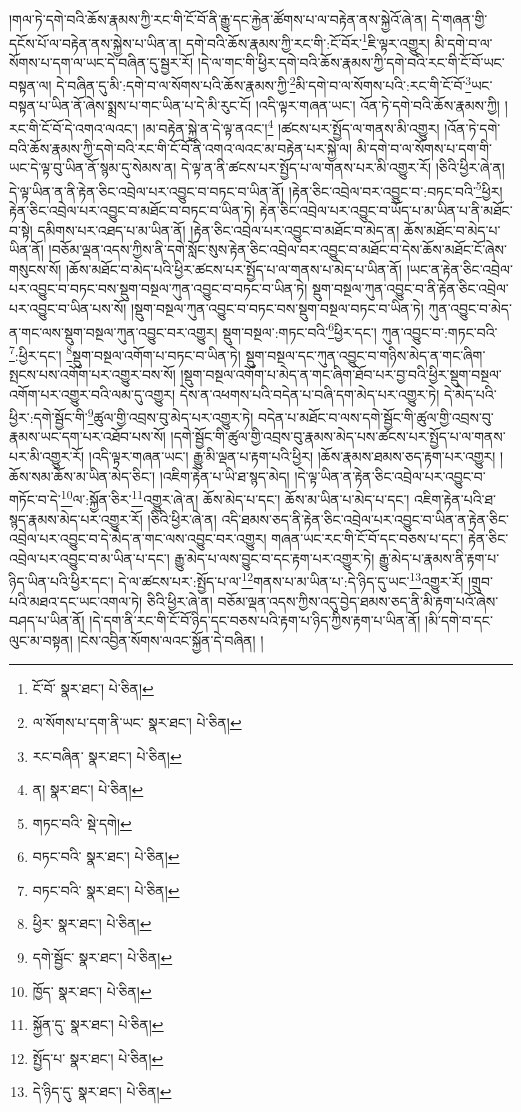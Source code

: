 །གལ་ཏེ་དགེ་བའི་ཆོས་རྣམས་ཀྱི་རང་གི་ངོ་བོ་ནི་རྒྱུ་དང་རྐྱེན་ཚོགས་པ་ལ་བརྟེན་ནས་སྐྱེའོ་ཞེ་ན། དེ་གཞན་གྱི་དངོས་པོ་ལ་བརྟེན་ནས་སྐྱེས་པ་ཡིན་ན། དགེ་བའི་ཆོས་རྣམས་ཀྱི་རང་གི་:ངོ་བོར་\footnote{ངོ་བོ་  སྣར་ཐང་།  པེ་ཅིན། }ཇི་ལྟར་འགྱུར། མི་དགེ་བ་ལ་སོགས་པ་དག་ལ་ཡང་དེ་བཞིན་དུ་སྦྱར་རོ། །དེ་ལ་གང་གི་ཕྱིར་དགེ་བའི་ཆོས་རྣམས་ཀྱི་དགེ་བའི་རང་གི་ངོ་བོ་ཡང་བསྟན་ལ། དེ་བཞིན་དུ་མི་:དགེ་བ་ལ་སོགས་པའི་ཆོས་རྣམས་ཀྱི་\footnote{ལ་སོགས་པ་དག་ནི་ཡང་  སྣར་ཐང་།  པེ་ཅིན། }མི་དགེ་བ་ལ་སོགས་པའི་:རང་གི་ངོ་བོ་\footnote{རང་བཞིན་  སྣར་ཐང་།  པེ་ཅིན། }ཡང་བསྟན་པ་ཡིན་ནོ་ཞེས་སྨྲས་པ་གང་ཡིན་པ་དེ་མི་རུང་ངོ། །འདི་ལྟར་གཞན་ཡང་། འོན་ཏེ་དགེ་བའི་ཆོས་རྣམས་ཀྱི། །རང་གི་ངོ་བོ་དེ་འགའ་ལའང་། །མ་བརྟེན་སྐྱེ་ན་དེ་ལྟ་ནའང་།\footnote{ན།  སྣར་ཐང་།  པེ་ཅིན། } །ཚངས་པར་སྤྱོད་ལ་གནས་མི་འགྱུར། །འོན་ཏེ་དགེ་བའི་ཆོས་རྣམས་ཀྱི་དགེ་བའི་རང་གི་ངོ་བོ་ནི་འགའ་ལའང་མ་བརྟེན་པར་སྐྱེ་ལ། མི་དགེ་བ་ལ་སོགས་པ་དག་གི་ཡང་དེ་ལྟ་བུ་ཡིན་ནོ་སྙམ་དུ་སེམས་ན། དེ་ལྟ་ན་ནི་ཚངས་པར་སྤྱོད་པ་ལ་གནས་པར་མི་འགྱུར་རོ། །ཅིའི་ཕྱིར་ཞེ་ན། དེ་ལྟ་ཡིན་ན་ནི་རྟེན་ཅིང་འབྲེལ་པར་འབྱུང་བ་བཏང་བ་ཡིན་ནོ། །རྟེན་ཅིང་འབྲེལ་བར་འབྱུང་བ་:བཏང་བའི་\footnote{གཏང་བའི་  སྡེ་དགེ། }ཕྱིར། རྟེན་ཅིང་འབྲེལ་པར་འབྱུང་བ་མཐོང་བ་བཏང་བ་ཡིན་ཏེ། རྟེན་ཅིང་འབྲེལ་པར་འབྱུང་བ་ཡོད་པ་མ་ཡིན་པ་ནི་མཐོང་བ་སྟེ། དམིགས་པར་འཐད་པ་མ་ཡིན་ནོ། །རྟེན་ཅིང་འབྲེལ་པར་འབྱུང་བ་མཐོང་བ་མེད་ན། ཆོས་མཐོང་བ་མེད་པ་ཡིན་ནོ། །བཅོམ་ལྡན་འདས་ཀྱིས་ནི་དགེ་སློང་སུས་རྟེན་ཅིང་འབྲེལ་བར་འབྱུང་བ་མཐོང་བ་དེས་ཆོས་མཐོང་ངོ་ཞེས་གསུངས་སོ། །ཆོས་མཐོང་བ་མེད་པའི་ཕྱིར་ཚངས་པར་སྤྱོད་པ་ལ་གནས་པ་མེད་པ་ཡིན་ནོ། །ཡང་ན་རྟེན་ཅིང་འབྲེལ་པར་འབྱུང་བ་བཏང་བས་སྡུག་བསྔལ་ཀུན་འབྱུང་བ་བཏང་བ་ཡིན་ཏེ། སྡུག་བསྔལ་ཀུན་འབྱུང་བ་ནི་རྟེན་ཅིང་འབྲེལ་པར་འབྱུང་བ་ཡིན་པས་སོ། །སྡུག་བསྔལ་ཀུན་འབྱུང་བ་བཏང་བས་སྡུག་བསྔལ་བཏང་བ་ཡིན་ཏེ། ཀུན་འབྱུང་བ་མེད་ན་གང་ལས་སྡུག་བསྔལ་ཀུན་འབྱུང་བར་འགྱུར། སྡུག་བསྔལ་:གཏང་བའི་\footnote{བཏང་བའི་  སྣར་ཐང་།  པེ་ཅིན། }ཕྱིར་དང་། ཀུན་འབྱུང་བ་:གཏང་བའི་\footnote{བཏང་བའི་  སྣར་ཐང་།  པེ་ཅིན། }:ཕྱིར་དང་། \footnote{ཕྱིར་  སྣར་ཐང་།  པེ་ཅིན། }སྡུག་བསྔལ་འགོག་པ་བཏང་བ་ཡིན་ཏེ། སྡུག་བསྔལ་དང་ཀུན་འབྱུང་བ་གཉིས་མེད་ན་གང་ཞིག་སྤངས་པས་འགོག་པར་འགྱུར་བས་སོ། །སྡུག་བསྔལ་འགོག་པ་མེད་ན་གང་ཞིག་ཐོབ་པར་བྱ་བའི་ཕྱིར་སྡུག་བསྔལ་འགོག་པར་འགྱུར་བའི་ལམ་དུ་འགྱུར། དེས་ན་འཕགས་པའི་བདེན་པ་བཞི་དག་མེད་པར་འགྱུར་ཏེ། དེ་མེད་པའི་ཕྱིར་:དགེ་སྦྱོང་གི་\footnote{དགེ་སྦྱོང་  སྣར་ཐང་།  པེ་ཅིན། }ཚུལ་གྱི་འབྲས་བུ་མེད་པར་འགྱུར་ཏེ། བདེན་པ་མཐོང་བ་ལས་དགེ་སྦྱོང་གི་ཚུལ་གྱི་འབྲས་བུ་རྣམས་ཡང་དག་པར་འཐོབ་པས་སོ། །དགེ་སྦྱོང་གི་ཚུལ་གྱི་འབྲས་བུ་རྣམས་མེད་པས་ཚངས་པར་སྤྱོད་པ་ལ་གནས་པར་མི་འགྱུར་རོ། །འདི་ལྟར་གཞན་ཡང་། རྒྱུ་མི་ལྡན་པ་རྟག་པའི་ཕྱིར། །ཆོས་རྣམས་ཐམས་ཅད་རྟག་པར་འགྱུར། །ཆོས་སམ་ཆོས་མ་ཡིན་མེད་ཅིང་། །འཇིག་རྟེན་པ་ཡི་ཐ་སྙད་མེད། །དེ་ལྟ་ཡིན་ན་རྟེན་ཅིང་འབྲེལ་པར་འབྱུང་བ་གཏོང་བ་དེ་\footnote{ཁྱོད་  སྣར་ཐང་།  པེ་ཅིན། }ལ་:སྐྱོན་ཅིར་\footnote{སྐྱོན་དུ་  སྣར་ཐང་།  པེ་ཅིན། }འགྱུར་ཞེ་ན། ཆོས་མེད་པ་དང་། ཆོས་མ་ཡིན་པ་མེད་པ་དང་། འཇིག་རྟེན་པའི་ཐ་སྙད་རྣམས་མེད་པར་འགྱུར་རོ། །ཅིའི་ཕྱིར་ཞེ་ན། འདི་ཐམས་ཅད་ནི་རྟེན་ཅིང་འབྲེལ་པར་འབྱུང་བ་ཡིན་ན་རྟེན་ཅིང་འབྲེལ་པར་འབྱུང་བ་དེ་མེད་ན་གང་ལས་འབྱུང་བར་འགྱུར། གཞན་ཡང་རང་གི་ངོ་བོ་དང་བཅས་པ་དང་། རྟེན་ཅིང་འབྲེལ་པར་འབྱུང་བ་མ་ཡིན་པ་དང་། རྒྱུ་མེད་པ་ལས་བྱུང་བ་དང་རྟག་པར་འགྱུར་ཏེ། རྒྱུ་མེད་པ་རྣམས་ནི་རྟག་པ་ཉིད་ཡིན་པའི་ཕྱིར་དང་། དེ་ལ་ཚངས་པར་:སྤྱོད་པ་ལ་\footnote{སྤྱོད་པ་  སྣར་ཐང་།  པེ་ཅིན། }གནས་པ་མ་ཡིན་པ་:དེ་ཉིད་དུ་ཡང་\footnote{དེ་ཉིད་དུ་  སྣར་ཐང་།  པེ་ཅིན། }འགྱུར་རོ། །གྲུབ་པའི་མཐའ་དང་ཡང་འགལ་ཏེ། ཅིའི་ཕྱིར་ཞེ་ན། བཅོམ་ལྡན་འདས་ཀྱིས་འདུ་བྱེད་ཐམས་ཅད་ནི་མི་རྟག་པའོ་ཞེས་བཤད་པ་ཡིན་ནོ། །དེ་དག་ནི་རང་གི་ངོ་བོ་ཉིད་དང་བཅས་པའི་རྟག་པ་ཉིད་ཀྱིས་རྟག་པ་ཡིན་ནོ། །མི་དགེ་བ་དང་ལུང་མ་བསྟན། །ངེས་འབྱིན་སོགས་ལའང་སྐྱོན་དེ་བཞིན། །
